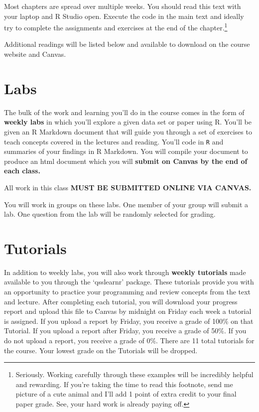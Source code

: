 \textbf{} 

Most chapters are spread over multiple weeks. You should read this text with your laptop and R Studio open. Execute the code in the main text and ideally try to complete the assignments and exercises at the end of the chapter.\footnote{Seriously. Working carefully through these examples will be incredibly helpful and rewarding. If you're taking the time to read this footnote, send me picture of a cute animal and I'll add 1 point of extra credit to your final paper grade. See, your hard work is already paying off.} 

Additional readings will be listed below and available to download on the course website and Canvas. 


\section{Labs}

The bulk of the work and learning you'll do in the course comes in the form of \textbf{weekly labs} in which you'll explore a given data set or paper using R. You'll be given an R Markdown document that will guide you through a set of exercises to teach concepts covered in the lectures and reading. You'll code in \texttt{R} and summaries of your findings in R Markdown. You will compile your document to produce an html document which you will \textbf{submit on Canvas by the end of each class.}

All work in this class \textbf{MUST BE SUBMITTED ONLINE VIA CANVAS.}

You will work in groups on these labs. One member of your group will submit a lab. One question from the lab will be randomly selected for grading. 

\section{Tutorials}

In addition to weekly labs, you will also work through \textbf{weekly tutorials} made available to you through the `qsslearnr' package. These tutorials provide you with an opportunity to practice your programming and review concepts from the text and lecture. After completing each tutorial, you will download your progress report and upload this file to Canvas by midnight on Friday each week a tutorial is assigned. If you upload a report by Friday, you receive a grade of 100\% on that Tutorial. If you upload a report after Friday, you receive a grade of 50\%. If you do not upload a report, you receive a grade of 0\%. There are 11 total tutorials for the course. Your lowest grade on the Tutorials will be dropped.

